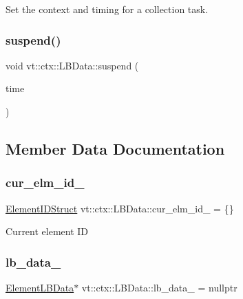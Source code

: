 Set the context and timing for a collection task. 

\mbox{\label{structvt_1_1ctx_1_1_l_b_data_accc285604c55529bfbd04ad244a5722e}} 
\subsubsection{\texorpdfstring{suspend()}{suspend()}}
{\footnotesize\ttfamily void vt\+::ctx\+::\+L\+B\+Data\+::suspend (\begin{DoxyParamCaption}\item[{\hyperlink{namespacevt_a2b9f28078dc309ad0706b69ded743e69}{Time\+Type}}]{time }\end{DoxyParamCaption})}



\subsection{Member Data Documentation}
\mbox{\label{structvt_1_1ctx_1_1_l_b_data_a8d84887a884c7f5783d4ccd7e5effd92}} 
\subsubsection{\texorpdfstring{cur\+\_\+elm\+\_\+id\+\_\+}{cur\_elm\_id\_}}
{\footnotesize\ttfamily \hyperlink{structvt_1_1ctx_1_1_l_b_data_aad9fac05c3faf80173b273d900db6fb1}{Element\+I\+D\+Struct} vt\+::ctx\+::\+L\+B\+Data\+::cur\+\_\+elm\+\_\+id\+\_\+ = \{\}\hspace{0.3cm}{\ttfamily [private]}}

Current element ID \mbox{\label{structvt_1_1ctx_1_1_l_b_data_a766b2b0aa69889fc3e397c7bfbb0b68a}} 
\subsubsection{\texorpdfstring{lb\+\_\+data\+\_\+}{lb\_data\_}}
{\footnotesize\ttfamily \hyperlink{structvt_1_1ctx_1_1_l_b_data_a11f1aeb75c01ae0c77d96f94ce1994bb}{Element\+L\+B\+Data}$\ast$ vt\+::ctx\+::\+L\+B\+Data\+::lb\+\_\+data\+\_\+ = nullptr\hspace{0.3cm}{\ttfamily [private]}}

